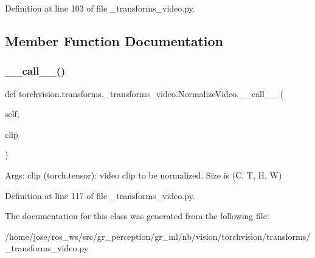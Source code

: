 Definition at line 103 of file \+\_\+transforms\+\_\+video.\+py.



\subsection{Member Function Documentation}
\mbox{\label{classtorchvision_1_1transforms_1_1__transforms__video_1_1NormalizeVideo_a054f98d66be0e760e208fdd6c3aaaecf}} 
\subsubsection{\texorpdfstring{\+\_\+\+\_\+call\+\_\+\+\_\+()}{\_\_call\_\_()}}
{\footnotesize\ttfamily def torchvision.\+transforms.\+\_\+transforms\+\_\+video.\+Normalize\+Video.\+\_\+\+\_\+call\+\_\+\+\_\+ (\begin{DoxyParamCaption}\item[{}]{self,  }\item[{}]{clip }\end{DoxyParamCaption})}

\begin{DoxyVerb}Args:
    clip (torch.tensor): video clip to be normalized. Size is (C, T, H, W)
\end{DoxyVerb}
 

Definition at line 117 of file \+\_\+transforms\+\_\+video.\+py.



The documentation for this class was generated from the following file\+:\begin{DoxyCompactItemize}
\item 
/home/jose/ros\+\_\+ws/src/gr\+\_\+perception/gr\+\_\+ml/nb/vision/torchvision/transforms/\+\_\+transforms\+\_\+video.\+py\end{DoxyCompactItemize}
